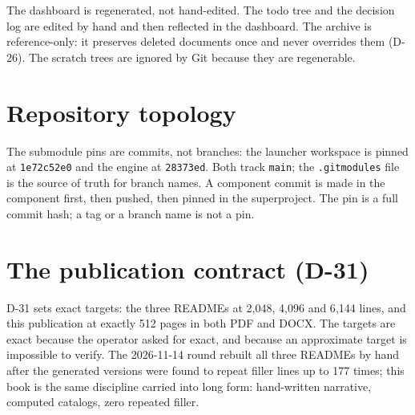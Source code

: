 \medskip
The dashboard is regenerated, not hand-edited. The todo tree and the decision log are edited by
hand and then reflected in the dashboard. The archive is reference-only: it preserves deleted
documents once and never overrides them (D-26). The scratch trees are ignored by Git because
they are regenerable.

\section{Repository topology}

The submodule pins are commits, not branches: the launcher workspace is pinned at
\texttt{1e72c52e0} and the engine at \texttt{28373ed}. Both track \texttt{main}; the
\texttt{.gitmodules} file is the source of truth for branch names. A component commit is made in
the component first, then pushed, then pinned in the superproject. The pin is a full commit hash;
a tag or a branch name is not a pin.

\section{The publication contract (D-31)}

D-31 sets exact targets: the three READMEs at 2{,}048, 4{,}096 and 6{,}144 lines, and this
publication at exactly 512 pages in both PDF and DOCX. The targets are exact because the operator
asked for exact, and because an approximate target is impossible to verify. The 2026-11-14 round
rebuilt all three READMEs by hand after the generated versions were found to repeat filler lines
up to 177 times; this book is the same discipline carried into long form: hand-written narrative,
computed catalogs, zero repeated filler.
